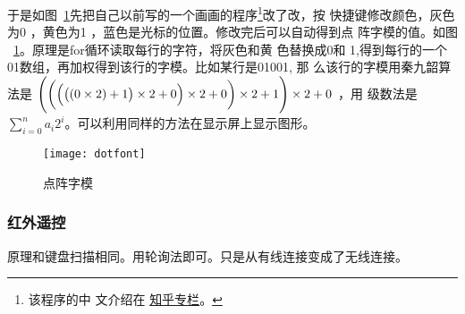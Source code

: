 \documentclass[../main]{subfiles}
\begin{document}
于是如图~\ref{fig:dotfont}先把自己以前写的一个画画的程序\footnote{该程序的中
文介绍在 \href{https://zhuanlan.zhihu.com/p/141065072}{知乎专栏}。}改了改，按
快捷键修改颜色，灰色为0 ，黄色为1 ，蓝色是光标的位置。修改完后可以自动得到点
阵字模的值。如图 ~\ref{fig:dotfont}。原理是for循环读取每行的字符，将灰色和黄
色替换成0和 1,得到每行的一个01数组，再加权得到该行的字模。比如某行是01001, 那
么该行的字模用秦九韶算法是 $\Biggl(\biggl(\Bigl(\bigl((0 \times 2) + 1\bigr)
\times 2 + 0\Bigr) \times 2 + 0\biggr) \times 2 + 1\Biggr) \times 2 + 0$ ，用
级数法是 $\sum^{n}_{i = 0} a_i2^i$。可以利用同样的方法在显示屏上显示图形。

\begin{figure}[htpb]
  \centering
  \texttt{[image: dotfont]}
  \caption{点阵字模}%
  \label{fig:dotfont}
\end{figure}

\subsubsection{红外遥控}%
\label{ssub:ir}

原理和键盘扫描相同。用轮询法即可。只是从有线连接变成了无线连接。
\end{document}
